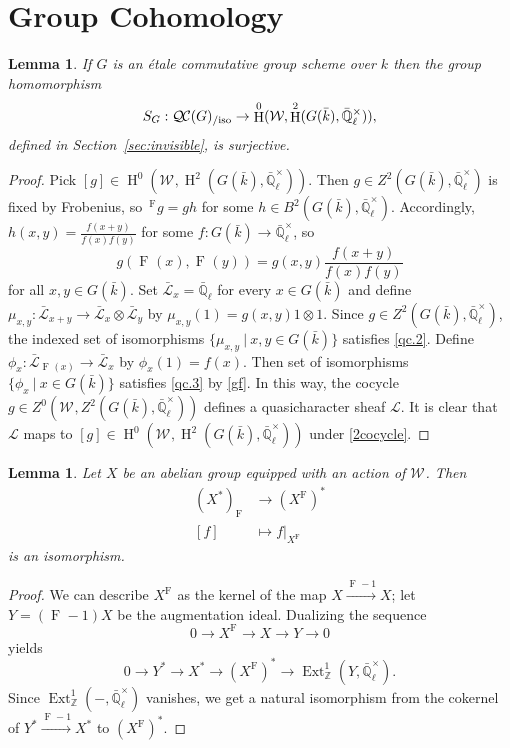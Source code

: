 \documentclass{amsart}
\theoremstyle{plain}
\newtheorem{lemma}[theorem]{Lemma}
\theoremstyle{definition}
\theoremstyle{remark}
\newcommand{\ZZ}{{\mathbb{Z}}}
\newcommand{\EE}{\mathbb{\bar Q}_\ell}
\newcommand{\bFq}{\bar{k}}
\newcommand{\Fq}{k}
\newcommand{\EEx}{\EE^\times}
\newcommand{\Weil}[1]{\mathcal{W}_{#1}}
\newcommand{\Frob}[1]{\operatorname{F}_{#1}}
\DeclareMathOperator{\Ext}{Ext}
\DeclareMathOperator{\Hh}{H}
\newcommand{\tq}{{\ \vert\ }}
\newcommand{\qcs}[1]{{\mathcal{#1}}}
\newcommand{\gqcs}[1]{{\mathcal{\bar #1}}}
\newcommand{\QC}{{\mathcal{Q\hskip-0.8pt C}}}
\newcommand{\QCiso}[1]{\QC(#1)_{/\text{iso}}}
\begin{document}
\section{Group Cohomology}

\begin{lemma}\label{lem:etale-2cocycle}
    If $G$ is an \'etale commutative group scheme over $\Fq$
    then the group homomorphism
    \[
    S_{G} : \QCiso{G} \to \Hh^0(\Weil{}, \Hh^2(G(\bFq),\EEx)),
    \]
    defined in Section~\ref{sec:invisible}, is surjective.
\end{lemma}

\begin{proof}
Pick $[g]\in \Hh^0(\Weil{}, \Hh^2(G(\bFq),\EEx))$. Then $g\in Z^2(G(\bFq),\EEx)$ is fixed by Frobenius, so $\,^{\Frob{}}g = g h$ for some $h\in B^2(G(\bFq),\EEx)$. Accordingly, $h(x,y) = \frac{f(x+y)}{f(x) f(y)}$ for some $f : G(\bFq) \to \EEx$, so
\begin{equation}\label{gf}
g(\Frob{}(x),\Frob{}(y)) = g(x,y) \frac{f(x+y)}{f(x) f(y)}
\end{equation}
for all $x,y\in G(\bFq)$.
Set $\gqcs{L}_x = \EE$ for every $x\in G(\bFq)$ and define $\mu_{x,y} : \gqcs{L}_{x+y} \to \gqcs{L}_x \otimes \gqcs{L}_y$ by $\mu_{x,y}(1) = g(x,y) 1 \otimes 1$.
Since $g\in Z^2(G(\bFq),\EEx)$, the indexed set of isomorphisms $\{ \mu_{x,y} \tq x,y \in G(\bFq) \}$ satisfies \ref{qc.2}.
Define $\phi_x : \gqcs{L}_{\Frob{}(x)}\to \gqcs{L}_x$ by $\phi_x(1) = f(x)$.
Then set of isomorphisms $\{ \phi_{x} \tq x \in G(\bFq) \}$ satisfies \ref{qc.3} by \eqref{gf}. In this way, the cocycle $g\in Z^0(\Weil{}, Z^2(G(\bFq),\EEx))$ defines a quasicharacter sheaf $\qcs{L}$. It is clear that $\qcs{L}$ maps to $[g] \in \Hh^0(\Weil{}, \Hh^2(G(\bFq),\EEx))$ under \eqref{2cocycle}.
\end{proof}


\begin{lemma} \label{lem:dual-inv}
Let $X$ be an abelian group equipped with an action of $\Weil{}$.
 Then
\begin{align*}
 (X^*)_{\Frob{}} &\to (X^{\Frob{}})^* \\
 [f] &\mapsto f|_{X^{\Frob{}}}
\end{align*}
is an isomorphism.
\end{lemma}

\begin{proof}
We can describe $X^{\Frob{}}$ as the kernel of the map $X \xrightarrow{\Frob{}-1} X$;
let $Y = (\Frob{}-1)X$ be the augmentation ideal.  Dualizing the sequence
\[
 0 \to X^{\Frob{}} \to X \to Y \to 0
\]
yields
\[
 0 \to Y^* \to X^* \to (X^{\Frob{}})^* \to \Ext^1_\ZZ(Y, \EEx).
\]
Since $\Ext^1_\ZZ(-,\EEx)$ vanishes, we get a natural isomorphism from the cokernel of $Y^* \xrightarrow{\Frob{}-1} X^*$ to $(X^{\Frob{}})^*$.
\end{proof}
\end{document}
